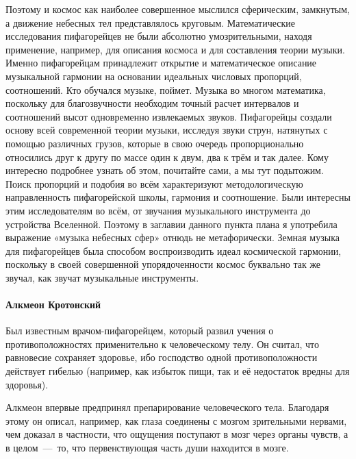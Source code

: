 Поэтому и космос как наиболее совершенное мыслился сферическим, замкнутым, а
движение небесных тел представлялось круговым. Математические исследования
пифагорейцев не были абсолютно умозрительными, находя применение, например, для
описания космоса и для составления теории музыки. Именно пифагорейцам
принадлежит открытие и математическое описание музыкальной гармонии на основании
идеальных числовых пропорций, соотношений. Кто обучался музыке, поймет. Музыка
во многом математика, поскольку для благозвучности необходим точный расчет
интервалов и соотношений высот одновременно извлекаемых звуков. Пифагорейцы
создали основу всей современной теории музыки, исследуя звуки струн, натянутых с
помощью различных грузов, которые в свою очередь пропорционально относились друг
к другу по массе один к двум, два к трём и так далее. Кому интересно подробнее
узнать об этом, почитайте сами, а мы тут подытожим. Поиск пропорций и подобия во
всём характеризуют методологическую направленность пифагорейской школы, гармония
и соотношение. Были интересны этим исследователям во всём, от звучания
музыкального инструмента до устройства Вселенной. Поэтому в заглавии данного
пункта плана я употребила выражение «музыка небесных сфер» отнюдь не
метафорически. Земная музыка для пифагорейцев была способом воспроизводить идеал
космической гармонии, поскольку в своей совершенной упорядоченности космос
буквально так же звучал, как звучат музыкальные инструменты. 

\paragraph{Алкмеон Кротонский} 
Был известным врачом-пифагорейцем, который развил учения о противоположностях применительно к человеческому телу. Он считал, что равновесие сохраняет здоровье, ибо господство одной противоположности действует гибелью (например, как избыток пищи, так и её недостаток вредны для здоровья).


Алкмеон впервые предпринял препарирование человеческого тела. Благодаря
этому он описал, например, как глаза соединены с мозгом зрительными нервами, чем доказал в частности, что ощущения поступают в мозг через органы чувств, а в целом~---~то, что первенствующая часть души находится в мозге. 

